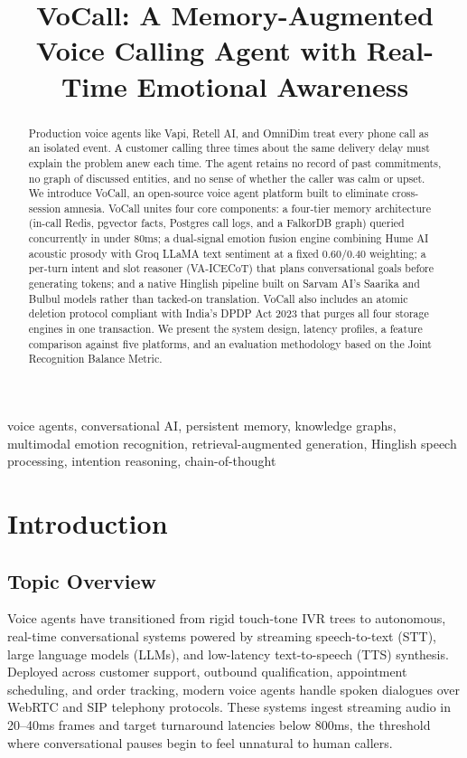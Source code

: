 \documentclass[conference]{IEEEtran}
\begin{document}
\title{VoCall: A Memory-Augmented Voice Calling Agent with Real-Time Emotional Awareness}

\author{
\and
{}
\and
{}
\and
{}
}

\maketitle

\begin{abstract}
Production voice agents like Vapi, Retell AI, and OmniDim treat every phone call as an isolated event. A customer calling three times about the same delivery delay must explain the problem anew each time. The agent retains no record of past commitments, no graph of discussed entities, and no sense of whether the caller was calm or upset. We introduce VoCall, an open-source voice agent platform built to eliminate cross-session amnesia. VoCall unites four core components: a four-tier memory architecture (in-call Redis, pgvector facts, Postgres call logs, and a FalkorDB graph) queried concurrently in under 80ms; a dual-signal emotion fusion engine combining Hume AI acoustic prosody with Groq LLaMA text sentiment at a fixed 0.60/0.40 weighting; a per-turn intent and slot reasoner (VA-ICECoT) that plans conversational goals before generating tokens; and a native Hinglish pipeline built on Sarvam AI's Saarika and Bulbul models rather than tacked-on translation. VoCall also includes an atomic deletion protocol compliant with India's DPDP Act 2023 that purges all four storage engines in one transaction. We present the system design, latency profiles, a feature comparison against five platforms, and an evaluation methodology based on the Joint Recognition Balance Metric.
\end{abstract}

\begin{IEEEkeywords}
voice agents, conversational AI, persistent memory, knowledge graphs, multimodal emotion recognition, retrieval-augmented generation, Hinglish speech processing, intention reasoning, chain-of-thought
\end{IEEEkeywords}

\section{Introduction}

\subsection{Topic Overview}
Voice agents have transitioned from rigid touch-tone IVR trees to autonomous, real-time conversational systems powered by streaming speech-to-text (STT), large language models (LLMs), and low-latency text-to-speech (TTS) synthesis. Deployed across customer support, outbound qualification, appointment scheduling, and order tracking, modern voice agents handle spoken dialogues over WebRTC and SIP telephony protocols. These systems ingest streaming audio in 20--40ms frames and target turnaround latencies below 800ms, the threshold where conversational pauses begin to feel unnatural to human callers.
\end{document}
